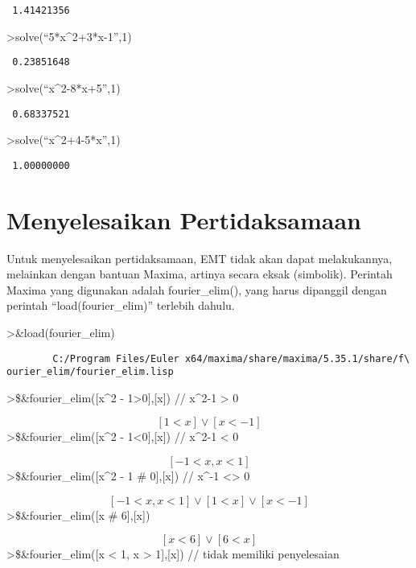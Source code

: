 \documentclass[
]{book}
\begin{document}
\begin{verbatim}
 1.41421356 
\end{verbatim}

\textgreater solve(``5*x\^{}2+3*x-1'',1)

\begin{verbatim}
 0.23851648 
\end{verbatim}

\textgreater solve(``x\^{}2-8*x+5'',1)

\begin{verbatim}
 0.68337521 
\end{verbatim}

\textgreater solve(``x\^{}2+4-5*x'',1)

\begin{verbatim}
 1.00000000 
\end{verbatim}

\chapter{Menyelesaikan Pertidaksamaan}\label{menyelesaikan-pertidaksamaan}

Untuk menyelesaikan pertidaksamaan, EMT tidak akan dapat melakukannya, melainkan dengan bantuan Maxima, artinya secara eksak (simbolik). Perintah Maxima yang digunakan adalah fourier\_elim(), yang harus dipanggil dengan perintah ``load(fourier\_elim)'' terlebih dahulu.

\textgreater\&load(fourier\_elim)

\begin{verbatim}
        C:/Program Files/Euler x64/maxima/share/maxima/5.35.1/share/f\
ourier_elim/fourier_elim.lisp
\end{verbatim}

\textgreater\$\&fourier\_elim({[}x\^{}2 - 1\textgreater0{]},{[}x{]}) // x\^{}2-1 \textgreater{} 0

\[\left[ 1<x \right] \lor \left[ x<-1 \right] \]\textgreater\$\&fourier\_elim({[}x\^{}2 - 1\textless0{]},{[}x{]}) // x\^{}2-1 \textless{} 0

\[\left[ -1<x , x<1 \right] \]\textgreater\$\&fourier\_elim({[}x\^{}2 - 1 \# 0{]},{[}x{]}) // x\^{}-1 \textless\textgreater{} 0

\[\left[ -1<x , x<1 \right] \lor \left[ 1<x \right] \lor \left[ x<-1
  \right] \]\textgreater\$\&fourier\_elim({[}x \# 6{]},{[}x{]})

\[\left[ x<6 \right] \lor \left[ 6<x \right] \]\textgreater\$\&fourier\_elim({[}x \textless{} 1, x \textgreater{} 1{]},{[}x{]}) // tidak memiliki penyelesaian
\end{document}
